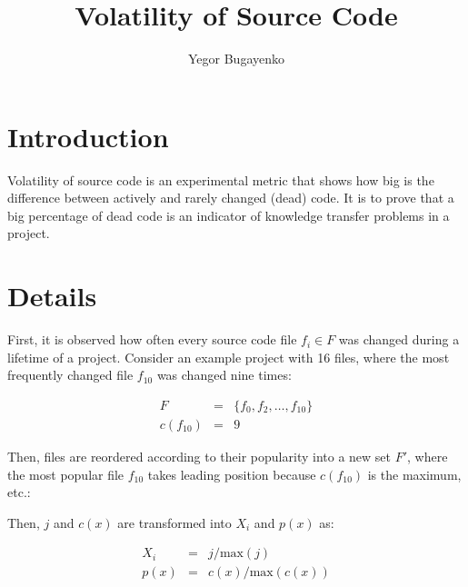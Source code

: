 \documentclass[12pt]{article}
\begin{document}
    \setlength{\parindent}{0pt}
    \setlength{\parskip}{1em}

\title{Volatility of Source Code}
\author{Yegor Bugayenko}
\maketitle

\section{Introduction}

    Volatility of source code is an experimental metric that
    shows how big is the difference between actively and rarely changed (dead)
    code. It is to prove that a big percentage of dead code is
    an indicator of knowledge transfer problems in a project.

\section{Details}

    First, it is observed how often every source code file $f_i \in F$ was changed
    during a lifetime of a project. Consider an example project with 16 files,
    where the most frequently changed file $f_{10}$ was changed nine times:

    \begin{eqnarray}
    F &=&  \{f_0, f_2, \dots, f_{10}\} \\
    c(f_{10}) &=& 9
    \end{eqnarray}

    \immediate{}
    

    Then, files are reordered according to their popularity into a new set $F'$,
    where the most popular file $f_{10}$ takes leading position because $c(f_{10})$ is
    the maximum, etc.:

    \immediate{}
    

    Then, $j$ and $c(x)$ are transformed into $X_i$ and $p(x)$ as:

    \begin{eqnarray}
    X_i &=& j / \mbox{max}(j) \\
    p(x) &=& c(x) / \mbox{max}(c(x))
    \end{eqnarray}

    \immediate{}
    
\end{document}
